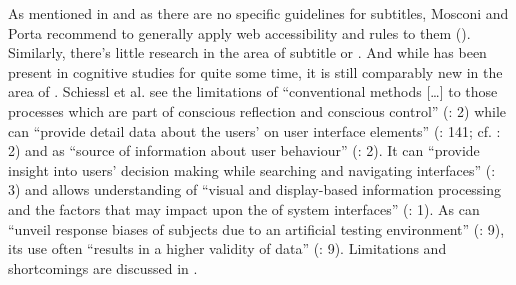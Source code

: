 As mentioned in  and as there are no specific  guidelines for subtitles, Mosconi and Porta recommend to generally apply web accessibility and  rules to them (\citealt{mosconi2012}). Similarly, there’s little  research in the area of subtitle  or . And while  has been present in cognitive studies for quite some time, it is still comparably new in the area of . Schiessl et al. see the limitations of “conventional methods […] to those processes which are part of conscious reflection and conscious control” (\citeyear{schiessl2003}: 2) while  can “provide detail data about the users’  on user interface elements” (\citealt{manhartsberger2005}: 141; cf. \citealt{schiessl2003}: 2) and as “source of information about user behaviour” (\citeyear{schiessl2003}: 2). It can “provide insight into users’ decision making while searching and navigating interfaces” (\citealt{Goldberg2002}: 3) and allows understanding of “visual and display-based information processing and the factors that may impact upon the  of system interfaces” (\citealt{poole2005}: 1). As  can “unveil response biases of subjects due to an artificial testing environment” (\citealt{schiessl2003}: 9), its use often “results in a higher validity of  data” (\citeyear{schiessl2003}: 9). Limitations and shortcomings are discussed in \citet{Jacob2003}.

